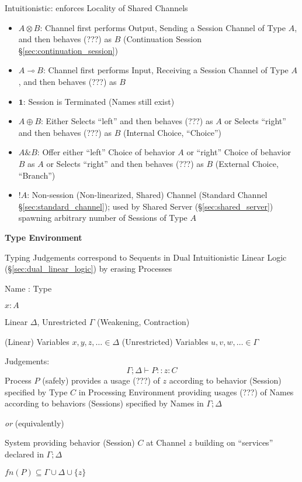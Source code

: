 Intuitionistic: enforces Locality of Shared Channels

\begin{itemize}
  \item $A \otimes B$: Channel first performs Output, Sending a
    Session Channel of Type $A$, and then behaves (???) as $B$
    (Continuation Session \S\ref{sec:continuation_session})
  \item $A \multimap B$: Channel first performs Input, Receiving a
    Session Channel of Type $A$, and then behaves (???) as $B$
  \item $\mathbf{1}$: Session is Terminated (Names still exist)
  \item $A \oplus B$: Either Selects ``left'' and then behaves (???)
    as $A$ or Selects ``right'' and then behaves (???) as $B$
    (Internal Choice, ``Choice'')
  \item $A \& B$: Offer either ``left'' Choice of behavior $A$ or
    ``right'' Choice of behavior $B$ as $A$ or Selects ``right'' and
    then behaves (???) as $B$ (External Choice, ``Branch'')
  \item $!A$: Non-session (Non-linearized, Shared) Channel (Standard
    Channel \S\ref{sec:standard_channel}); used by Shared Server
    (\S\ref{sec:shared_server}) spawning arbitrary number of Sessions
    of Type $A$
\end{itemize}


\textbf{Type Environment}
\cite{caires-pfenning10}

Typing Judgements correspond to Sequents in Dual Intuitionistic Linear
Logic (\S\ref{sec:dual_linear_logic}) by erasing Processes

Name : Type

$x : A$

Linear $\Delta$, Unrestricted $\Gamma$ (Weakening, Contraction)

(Linear) Variables $x,y,z,\ldots \in \Delta$
(Unrestricted) Variables $u,v,w,\ldots \in \Gamma$


Judgements:
\[
  \Gamma; \Delta \vdash P :: z:C
\]
Process $P$ (safely) provides a usage (???) of $z$ according to
behavior (Session) specified by Type $C$ in Processing Environment
providing usages (???) of Names according to behaviors (Sessions)
specified by Names in $\Gamma; \Delta$

\emph{or} (equivalently)

System providing behavior (Session) $C$ at Channel $z$ building on
``services'' declared in $\Gamma; \Delta$

$fn(P) \subseteq \Gamma \cup \Delta \cup \{z\}$

